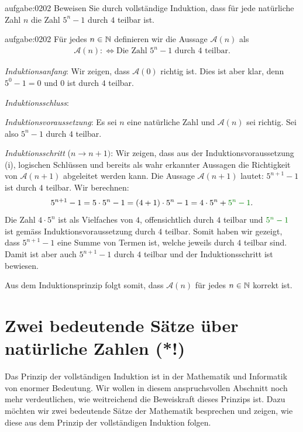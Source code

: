 \begin{aufgabe}{aufgabe:0202}
Beweisen Sie durch vollständige Induktion, dass für jede natürliche Zahl $n$ die Zahl $5^n-1$ durch $4$ teilbar ist.
\end{aufgabe}
\begin{antwort}{aufgabe:0202}
Für jedes $n\in\mathbb{N}$ definieren wir die Aussage $\mathcal{A}(n)$ als
\begin{align*}
    \mathcal{A}(n) :\iff \text{Die Zahl $5^n-1$ durch $4$ teilbar}.
\end{align*}
\begin{aenum}
    \item \textit{Induktionsanfang}: Wir zeigen, dass $\mathcal{A}(0)$ richtig ist. Dies ist aber klar, denn $5^0-1=0$ und $0$ ist durch $4$ teilbar.
    \item \textit{Induktionsschluss}:
        \begin{renum}
            \item \textit{Induktionsvoraussetzung}: Es sei $n$ eine natürliche Zahl und $\mathcal{A}(n)$ sei richtig. Sei also $5^n-1$ durch $4$ teilbar.
            \item \textit{Induktionsschritt} ($n\to n+1)$: Wir zeigen, dass aus der Induktionsvoraussetzung (i), logischen Schlüssen und bereits als wahr erkannter Aussagen die Richtigkeit von $\mathcal{A}(n+1)$ abgeleitet werden kann. Die Aussage $\mathcal{A}(n+1)$ lautet: $5^{n+1}-1$ ist durch $4$ teilbar. Wir berechnen:
            \begin{align*}
                5^{n+1}-1 = 5\cdot 5^{n}-1 = (4+1)\cdot 5^n - 1 = 4\cdot 5^n + \textcolor{Green}{5^n -1}.
            \end{align*}
            Die Zahl $4\cdot 5^n$ ist als Vielfaches von $4$, offensichtlich durch $4$ teilbar und $\textcolor{Green}{5^n -1}$ ist gemäss Induktionsvoraussetzung durch $4$ teilbar. Somit haben wir gezeigt, dass $5^{n+1}-1$ eine Summe von Termen ist, welche jeweils durch $4$ teilbar sind. Damit ist aber auch $5^{n+1}-1$ durch $4$ teilbar und der Induktionsschritt ist bewiesen.
        \end{renum}
\end{aenum}
Aus dem Induktionsprinzip folgt somit, dass $\mathcal{A}(n)$ für jedes $n\in\mathbb{N}$ korrekt ist.
\end{antwort}


\section{Zwei bedeutende Sätze über natürliche Zahlen (*!)}
Das Prinzip der vollständigen Induktion ist in der Mathematik und Informatik von enormer Bedeutung. Wir wollen in diesem anspruchsvollen Abschnitt noch mehr verdeutlichen, wie weitreichend die Beweiskraft dieses Prinzips ist. Dazu möchten wir zwei bedeutende Sätze der Mathematik besprechen und zeigen, wie diese aus dem Prinzip der vollständigen Induktion folgen.
